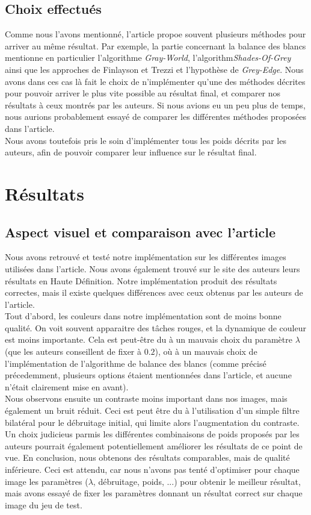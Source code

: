 \documentclass[twoside]{article}
\begin{document}
\begin{multicols}{2}
\subsection{Choix effectués}
Comme nous l'avons mentionné, l'article propoe souvent plusieurs méthodes pour arriver au même résultat. Par exemple, la partie concernant la balance des blancs mentionne en particulier l'algorithme \emph{Gray-World}, l'algorithm\emph{Shades-Of-Grey} ainsi que les approches de Finlayson et Trezzi et l'hypothèse de \emph{Grey-Edge}. Nous avons dans ces cas là fait le choix de n'implémenter qu'une des méthodes décrites pour pouvoir arriver le plus vite possible au résultat final, et comparer nos résultats à ceux montrés par les auteurs. Si nous avions eu un peu plus de temps, nous aurions probablement essayé de comparer les différentes méthodes proposées dans l'article.\\
Nous avons toutefois pris le soin d'implémenter tous les poids décrits par les auteurs, afin de pouvoir comparer leur influence sur le résultat final.

\section{Résultats}
\subsection{Aspect visuel et comparaison avec l'article}
Nous avons retrouvé et testé notre implémentation sur les différentes images utilisées dans l'article. Nous avons également trouvé sur le site des auteurs leurs résultats en Haute Définition. Notre implémentation produit des résultats correctes, mais il existe quelques différences avec ceux obtenus par les auteurs de l'article. \\
Tout d'abord, les couleurs dans notre implémentation sont de moins bonne qualité. On voit souvent apparaitre des tâches rouges, et la dynamique de couleur est moins importante. Cela est peut-être du à un mauvais choix du paramètre $\lambda$ (que les auteurs conseillent de fixer à $0.2$), où à un mauvais choix de l'implémentation de l'algorithme de balance des blancs (comme précisé précedemment, plusieurs options étaient mentionnées dans l'article, et aucune n'était clairement mise en avant).\\
Nous observons ensuite un contraste moins important dans nos images, mais également un bruit réduit. Ceci est peut être du à l'utilisation d'un simple filtre bilatéral pour le débruitage initial, qui limite alors l'augmentation du contraste. Un choix judicieus parmis les différentes combinaisons de poids proposés par les auteurs pourrait également potentiellement améliorer les résultats de ce point de vue.
En conclusion, nous obtenons des résultats comparables, mais de qualité inférieure. Ceci est attendu, car nous n'avons pas tenté d'optimiser pour chaque image les paramètres ($\lambda$, débruitage, poids, ...) pour obtenir le meilleur résultat, mais avons essayé de fixer les paramètres donnant un résultat correct sur chaque image du jeu de test.


\end{multicols}
\end{document}

